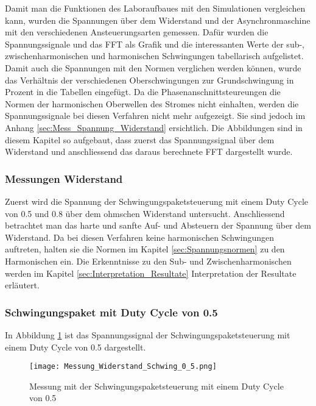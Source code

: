 Damit man die Funktionen des Laboraufbaues mit den Simulationen vergleichen kann, wurden die Spannungen über dem Widerstand und der Asynchronmaschine mit den verschiedenen Ansteuerungsarten gemessen. Dafür wurden die Spannungssignale und das FFT als Grafik und die interessanten Werte der sub-, zwischenharmonischen und harmonischen Schwingungen tabellarisch aufgelistet. Damit auch die Spannungen mit den Normen verglichen werden können, wurde das Verhältnis der verschiedenen Oberschwingungen zur Grundschwingung in Prozent in die Tabellen eingefügt. Da die Phasenanschnittsteureungen die Normen der harmonischen Oberwellen des Stromes nicht einhalten, werden die Spannungssignale bei diesen Verfahren nicht mehr aufgezeigt. Sie sind jedoch im Anhang \ref{sec:Mess_Spannung_Widerstand} ersichtlich. Die Abbildungen sind in diesem Kapitel so aufgebaut, dass zuerst das Spannungssignal über dem Widerstand und anschliessend das daraus berechnete FFT dargestellt wurde.

\subsubsection{Messungen Widerstand}

Zuerst wird die Spannung der Schwingungspaketsteuerung mit einem Duty Cycle von 0.5 und 0.8 über dem ohmschen Widerstand untersucht. Anschliessend betrachtet man das harte und sanfte Auf- und Absteuern der Spannung über dem Widerstand. Da bei diesen Verfahren keine harmonischen Schwingungen auftreten, halten sie die Normen im Kapitel \ref{sec:Spannungsnormen} zu den Harmonischen ein. Die Erkenntnisse zu den Sub- und Zwischenharmonischen werden im Kapitel \ref{sec:Interpretation_Resultate} Interpretation der Resultate erläutert.

\subsubsection*{Schwingungspaket mit Duty Cycle von 0.5}

In Abbildung \ref{fig:Mess_Schwing_50} ist das Spannungssignal der Schwingungspaketsteuerung mit einem Duty Cycle von 0.5 dargestellt.


\begin{figure}[ht!]
	\centering
	\texttt{[image: Messung\_Widerstand\_Schwing\_0\_5.png]}	
	\caption{Messung mit der Schwingungspaketsteuerung mit einem Duty Cycle von 0.5}\label{fig:Mess_Schwing_50}
\end{figure}


